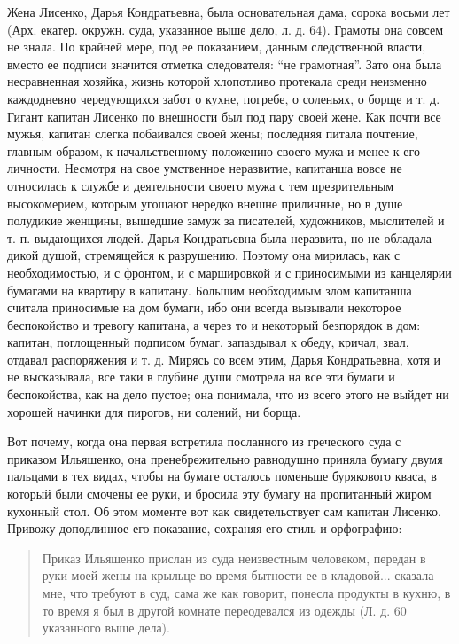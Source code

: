 \documentclass[a4paper,20pt]{article}
\begin{document}
Жена Лисенко, Дарья Кондратьевна, была основательная дама, сорока восьми лет 
(Арх. екатер. окружн. суда, указанное выше дело, л. д. 64). Грамоты она совсем не знала.
По крайней мере, под ее показанием, данным следственной власти,
 вместо ее подписи значится отметка следователя:
``не грамотная''. Зато она была несравненная хозяйка,
жизнь которой хлопотливо протекала среди неизменно каждодневно чередующихся 
забот о кухне, погребе, о соленьях,
о борще и т. д. Гигант капитан Лисенко по внешности
был под пару своей жене. Как почти все мужья, капитан слегка побаивался своей жены; 
последняя питала почтение, главным образом, к начальственному положению своего мужа и менее к его
личности. Несмотря на свое умственное неразвитие, капитанша вовсе не относилась к службе и деятельности
своего мужа с тем презрительным высокомерием, которым угощают нередко внешне приличные, но в душе полудикие
женщины, вышедшие замуж за писателей, художников, мыслителей и т. п. выдающихся людей.
Дарья Кондратьевна была неразвита, но не обладала дикой душой, стремящейся к разрушению.
Поэтому она мирилась, как с необходимостью, и с фронтом, и с маршировкой и с приносимыми из канцелярии
бумагами на квартиру в капитану. Большим необходимым
злом капитанша считала приносимые на дом бумаги, ибо
они всегда вызывали некоторое беспокойство и тревогу капитана, 
а через то и некоторый безпорядок в дом: капитан, поглощенный подписом бумаг, 
запаздывал к обеду, кричал, звал, отдавал распоряжения и т. д. Мирясь
со всем этим, Дарья Кондратьевна, хотя и не высказывала,
все таки в глубине души смотрела на все эти бумаги и беспокойства,
как на дело пустое; она понимала, что из всего этого не
выйдет ни хорошей начинки для пирогов, ни солений, ни борща.

Вот почему, когда она первая встретила посланного
из греческого суда с приказом Ильяшенко, она пренебрежительно равнодушно приняла бумагу
двумя пальцами в
тех видах, чтобы на бумаге осталось поменьше бурякового
кваса, в который были смочены ее руки, и бросила эту
бумагу на пропитанный жиром кухонный стол. Об этом
моменте вот как свидетельствует сам капитан Лисенко.
Привожу доподлинное его показание, сохраняя его стиль и орфографию:

\begin{quote}
\em\bfseries
	
Приказ Ильяшенко прислан из суда неизвестным человеком, передан в руки моей
жены на крыльце во время бытности ее в кладовой... сказала мне, что
требуют в суд, сама же как говорит, понесла продукты в кухню, в то
время я был в другой комнате переодевался из одежды (Л. д. 60
указанного выше дела).

\end{quote}
\end{document}

